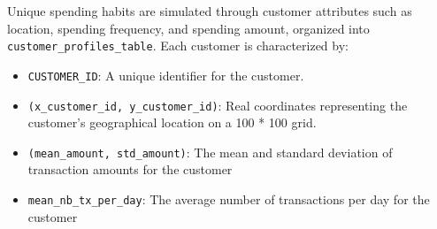     Unique spending habits are simulated through customer attributes such as
location, spending frequency, and spending amount, organized into
\texttt{customer\_profiles\_table}. Each customer is characterized by:

\begin{itemize}
\tightlist
\item
  \texttt{CUSTOMER\_ID}: A unique identifier for the customer.
\item
  \texttt{(x\_customer\_id,\ y\_customer\_id)}: Real coordinates
  representing the customer's geographical location on a 100 * 100 grid.
\item
  \texttt{(mean\_amount,\ std\_amount)}: The mean and standard deviation
  of transaction amounts for the customer
\item
  \texttt{mean\_nb\_tx\_per\_day}: The average number of transactions
  per day for the customer
\end{itemize}

